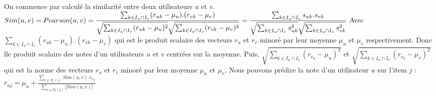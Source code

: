 \documentclass[12pt]{article}
\begin{document}
On commence par calcul\'e la similarit\'e entre deux utilisateurs $u$ et $v$.
\newline\newline
$\displaystyle Sim(u,v)
\newline
=Pearson(u,v)
={\frac {\sum _{k \in{I_u\cap{I_v}}}(r_{uk}-{\mu_u}).(r_{vk}-{\mu_v})}{{\sqrt {\sum _{k \in{I_u\cap{I_v}}}(r_{uk}-{\mu_u})^{2}}}{\sqrt {\sum _{k \in{I_u\cap{I_v}}}(r_{vk}-{\mu_v})^{2}}}}}
\newline
={\frac {\sum _{k \in{I_u\cap{I_v}}} s_{uk}. s_{vk}}{{\sqrt {\sum _{k \in{I_u\cap{I_v}}}s_{uk}^{2}}}{\sqrt {\sum _{k \in{I_u\cap{I_v}}}s_{vk}^{2}}}}}$
\newline\newline
Avec
${\sum _{k \in{I_u\cap{I_v}}}(r_{uk}-{\mu_u}).(r_{vk}-{\mu_v})}$ qui est le produit scalaire des vecteurs $r_{u}$ et $r_{v}$ minor\'e par leur moyenne $\mu_u$ et $\mu_v$ respectivement. Donc lle produit scalaire des notes d'un utilisateurs $u$ et $v$ centr\'ees sur la moyenne.
\newline\newline
Puis, $\sqrt {\sum _{k \in{I_u\cap{I_v}}}(r_{v_u}-{\mu_u})^{2}}$ et $\sqrt {\sum _{k \in{I_u\cap{I_v}}}(r_{v_k}-{\mu_v})^{2}}$ qui est la norme des vecteurs $r_{u}$ et $r_{v}$ minor\'e par leur moyenne $\mu_u$ et $\mu_v$.
\newline\newline
Nous pouvons pr\'edire la note d'un utilisateur $u$ sur l'item $j$ :
 \newline\newline
$\displaystyle r_{uj}= \mu_u + {\frac {\sum _{v \in{P_u(j)}} Sim(u,v) . s_{vj}}{\sum _{v \in{P_u(j)}} |Sim(u,v)|}}$
\newline\newline
\end{document}
